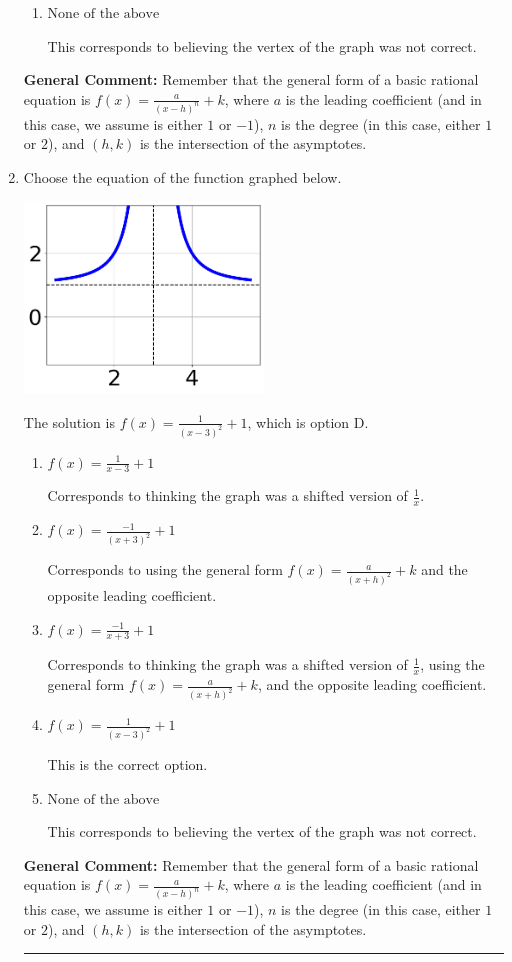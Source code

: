 \documentclass{extbook}[14pt]
\newcommand{\litem}[1]{\item #1

\rule{\textwidth}{0.4pt}}
\begin{document}
\begin{enumerate}
{\begin{enumerate}[label=\Alph*.]
Corresponds to thinking the graph was a shifted version of $\frac{1}{x^2}$.
\item \( \text{None of the above} \)

This corresponds to believing the vertex of the graph was not correct.
\end{enumerate}

\textbf{General Comment:} Remember that the general form of a basic rational equation is $ f(x) = \frac{a}{(x-h)^n} + k$, where $a$ is the leading coefficient (and in this case, we assume is either $1$ or $-1$), $n$ is the degree (in this case, either $1$ or $2$), and $(h, k)$ is the intersection of the asymptotes.
}
\litem{
Choose the equation of the function graphed below.

\begin{center}
    \includegraphics[width=0.5\textwidth]{../Figures/rationalGraphToEquationCopyB.png}
\end{center}


The solution is \( f(x) = \frac{1}{(x - 3)^2} + 1 \), which is option D.\begin{enumerate}[label=\Alph*.]
\item \( f(x) = \frac{1}{x - 3} + 1 \)

Corresponds to thinking the graph was a shifted version of $\frac{1}{x}$.
\item \( f(x) = \frac{-1}{(x + 3)^2} + 1 \)

Corresponds to using the general form $f(x) = \frac{a}{(x+h)^2}+k$ and the opposite leading coefficient.
\item \( f(x) = \frac{-1}{x + 3} + 1 \)

Corresponds to thinking the graph was a shifted version of $\frac{1}{x}$, using the general form $f(x) = \frac{a}{(x+h)^2}+k$, and the opposite leading coefficient.
\item \( f(x) = \frac{1}{(x - 3)^2} + 1 \)

This is the correct option.
\item \( \text{None of the above} \)

This corresponds to believing the vertex of the graph was not correct.
\end{enumerate}

\textbf{General Comment:} Remember that the general form of a basic rational equation is $ f(x) = \frac{a}{(x-h)^n} + k$, where $a$ is the leading coefficient (and in this case, we assume is either $1$ or $-1$), $n$ is the degree (in this case, either $1$ or $2$), and $(h, k)$ is the intersection of the asymptotes.
}
\end{enumerate}
\end{document}
